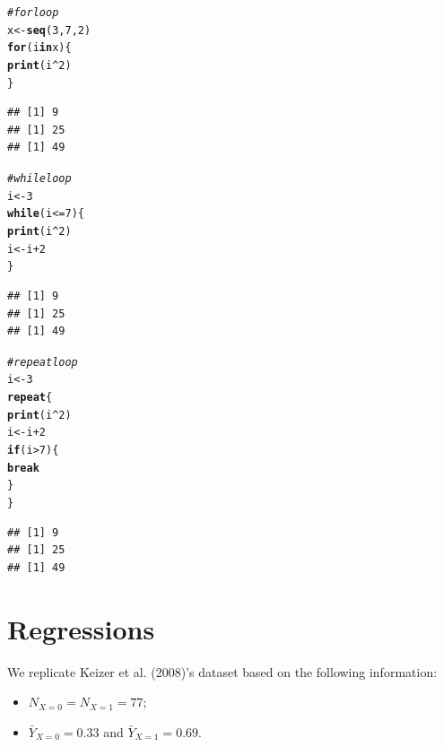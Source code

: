 \documentclass[11pt]{article}\usepackage[]{graphicx}\usepackage[]{color}
\makeatletter
\newcommand{\hlnum}[1]{\textcolor[rgb]{0.686,0.059,0.569}{#1}}%
\newcommand{\hlcom}[1]{\textcolor[rgb]{0.678,0.584,0.686}{\textit{#1}}}%
\newcommand{\hlopt}[1]{\textcolor[rgb]{0,0,0}{#1}}%
\newcommand{\hlstd}[1]{\textcolor[rgb]{0.345,0.345,0.345}{#1}}%
\newcommand{\hlkwa}[1]{\textcolor[rgb]{0.161,0.373,0.58}{\textbf{#1}}}%
\newcommand{\hlkwb}[1]{\textcolor[rgb]{0.69,0.353,0.396}{#1}}%
\newcommand{\hlkwd}[1]{\textcolor[rgb]{0.737,0.353,0.396}{\textbf{#1}}}%
\newenvironment{kframe}{%
 \def\at@end@of@kframe{}%
 \ifinner\ifhmode%
  \def\at@end@of@kframe{\end{minipage}}%
  \begin{minipage}{\columnwidth}%
 \fi\fi%
 \def\FrameCommand##1{\hskip\@totalleftmargin \hskip-\fboxsep
 \colorbox{shadecolor}{##1}\hskip-\fboxsep
     \hskip-\linewidth \hskip-\@totalleftmargin \hskip\columnwidth}%
 \MakeFramed {\advance\hsize-\width
   \@totalleftmargin\z@ \linewidth\hsize
   \@setminipage}}%
 {\par\unskip\endMakeFramed%
 \at@end@of@kframe}
\newenvironment{knitrout}{}{} %
\makeatother
\begin{document}
\begin{knitrout}
\color{fgcolor}\begin{kframe}
\begin{alltt}
\hlcom{# for loop}
\hlstd{x} \hlkwb{<-} \hlkwd{seq}\hlstd{(}\hlnum{3}\hlstd{,}\hlnum{7}\hlstd{,}\hlnum{2}\hlstd{)}
\hlkwa{for} \hlstd{(i} \hlkwa{in} \hlstd{x)\{}
        \hlkwd{print}\hlstd{(i}\hlopt{^}\hlnum{2}\hlstd{)}
\hlstd{\}}
\end{alltt}
\begin{verbatim}
## [1] 9
## [1] 25
## [1] 49
\end{verbatim}
\begin{alltt}
\hlcom{# while loop}
\hlstd{i} \hlkwb{<-} \hlnum{3}
\hlkwa{while}\hlstd{(i} \hlopt{<=} \hlnum{7}\hlstd{)\{}
        \hlkwd{print}\hlstd{(i}\hlopt{^}\hlnum{2}\hlstd{)}
        \hlstd{i} \hlkwb{<-} \hlstd{i}\hlopt{+}\hlnum{2}
\hlstd{\}}
\end{alltt}
\begin{verbatim}
## [1] 9
## [1] 25
## [1] 49
\end{verbatim}
\begin{alltt}
\hlcom{# repeat loop}
\hlstd{i} \hlkwb{<-} \hlnum{3}
\hlkwa{repeat}\hlstd{\{}
        \hlkwd{print}\hlstd{(i}\hlopt{^}\hlnum{2}\hlstd{)}
        \hlstd{i} \hlkwb{<-} \hlstd{i}\hlopt{+}\hlnum{2}
        \hlkwa{if}\hlstd{(i} \hlopt{>} \hlnum{7}\hlstd{)\{}
                \hlkwa{break}
        \hlstd{\}}
\hlstd{\}}
\end{alltt}
\begin{verbatim}
## [1] 9
## [1] 25
## [1] 49
\end{verbatim}
\end{kframe}
\end{knitrout}

\section{Regressions}

We replicate Keizer et al. (2008)'s dataset based on the following information:
\begin{itemize}
\item $N_{X=0} = N_{X=1} = 77$;
\item $\bar{Y}_{X=0} = 0.33$ and $\bar{Y}_{X=1} = 0.69$.
\end{itemize}
\end{document}
